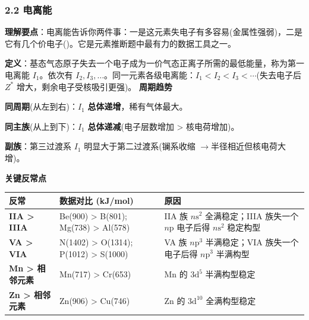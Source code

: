 \documentclass[a4paper,11pt]{ctexart}
\newcounter{none}
\newcommand{\箭}{\ensuremath{\rightarrow}}
\newcommand{\左箭}{\ensuremath{\leftarrow}}
\newcommand{\上箭}{\ensuremath{\uparrow}}
\newcommand{\下箭}{\ensuremath{\downarrow}}
\newcommand{\衡}{\ensuremath{\rightleftharpoons}}
\newcommand{\双箭}{\ensuremath{\leftrightarrow}}
\newcommand{\约等于}{\ensuremath{\approx}}
\newcommand{\小于等于}{\ensuremath{\leq}}
\newcommand{\大于等于}{\ensuremath{\geq}}
\newcommand{\不等于}{\ensuremath{\neq}}
\newcommand{\西格马}{\ensuremath{\sigma}}
\newcommand{\派}{\ensuremath{\pi}}
\begin{document}
\subsubsection{2.2 电离能}\label{ux7535ux79bbux80fd}

\textbf{理解要点}：电离能告诉你两件事：一是这元素失电子有多容易(金属性强弱)，二是它有几个价电子()。它是元素推断题中最有力的数据工具之一。

\textbf{定义}：基态气态原子失去一个电子成为一价气态正离子所需的最低能量，称为第一电离能 \(I_1\)。依次有 \(I_2, I_3, \dots\)。同一元素各级电离能：\(I_1 < I_2 < I_3 < \cdots\)(失去电子后 \(Z^*\) 增大，剩余电子受核吸引更强)。
\textbf{周期趋势}

\textbf{同周期}(从左到右)：\(I_1\) \textbf{总体递增}，稀有气体最大。

\textbf{同主族}(从上到下)：\(I_1\) \textbf{总体递减}(电子层数增加 \textgreater{} 核电荷增加)。

\textbf{副族}：第三过渡系 \(I_1\) 明显大于第二过渡系(镧系收缩 \箭 半径相近但核电荷大增)。

\textbf{关键反常点}

{\def\LTcaptype{none} %
\begin{longtable}[]{@{}
  >{\raggedright\arraybackslash}p{}
  >{\raggedright\arraybackslash}p{}
  >{\raggedright\arraybackslash}p{}@{}}
\toprule\noalign{}
\begin{minipage}[b]{\linewidth}\raggedright
反常
\end{minipage} & \begin{minipage}[b]{\linewidth}\raggedright
数据对比 (kJ/mol)
\end{minipage} & \begin{minipage}[b]{\linewidth}\raggedright
原因
\end{minipage} \\
\midrule\noalign{}
\endhead
\bottomrule\noalign{}
\endlastfoot
\textbf{IIA \textgreater{} IIIA} & Be(900) \textgreater{} B(801); Mg(738) \textgreater{} Al(578) & IIA 族 \(n\mathrm{s}^2\) 全满稳定；IIIA 族失一个 \(n\mathrm{p}\) 电子后得 \(n\mathrm{s}^2\) 稳定构型 \\
\textbf{VA \textgreater{} VIA} & N(1402) \textgreater{} O(1314); P(1012) \textgreater{} S(1000) & VA 族 \(n\mathrm{p}^3\) 半满稳定；VIA 族失一个电子后得 \(n\mathrm{p}^3\) 半满构型 \\
\textbf{Mn \textgreater{} 相邻元素} & Mn(717) \textgreater{} Cr(653) & Mn 的 \(3\mathrm{d}^5\) 半满构型稳定 \\
\textbf{Zn \textgreater{} 相邻元素} & Zn(906) \textgreater{} Cu(746) & Zn 的 \(3\mathrm{d}^{10}\) 全满构型稳定 \\
\end{longtable}
}
\end{document}
